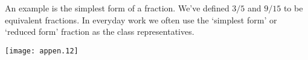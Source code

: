 An example is the simplest form of a fraction.
We've defined \( 3/5 \) and \( 9/15 \) to be equivalent fractions.
In everyday work we often use the `simplest form' or `reduced form'
fraction as the class representatives.
\begin{center}
  \texttt{[image: appen.12]}
%
%
%
%
\end{center}
%
